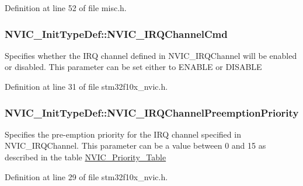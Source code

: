 Definition at line 52 of file misc.\+h.

\subsubsection[{\texorpdfstring{N\+V\+I\+C\+\_\+\+I\+R\+Q\+Channel\+Cmd}{NVIC_IRQChannelCmd}}]{ N\+V\+I\+C\+\_\+\+Init\+Type\+Def\+::\+N\+V\+I\+C\+\_\+\+I\+R\+Q\+Channel\+Cmd}\hypertarget{struct_n_v_i_c___init_type_def_acb23fabb995fa4980c768825f12f5815}{}\label{struct_n_v_i_c___init_type_def_acb23fabb995fa4980c768825f12f5815}
Specifies whether the I\+RQ channel defined in N\+V\+I\+C\+\_\+\+I\+R\+Q\+Channel will be enabled or disabled. This parameter can be set either to E\+N\+A\+B\+LE or D\+I\+S\+A\+B\+LE 

Definition at line 31 of file stm32f10x\+\_\+nvic.\+h.

\subsubsection[{\texorpdfstring{N\+V\+I\+C\+\_\+\+I\+R\+Q\+Channel\+Preemption\+Priority}{NVIC_IRQChannelPreemptionPriority}}]{ N\+V\+I\+C\+\_\+\+Init\+Type\+Def\+::\+N\+V\+I\+C\+\_\+\+I\+R\+Q\+Channel\+Preemption\+Priority}\hypertarget{struct_n_v_i_c___init_type_def_adc8226d770dbf7513448c12e14f30198}{}\label{struct_n_v_i_c___init_type_def_adc8226d770dbf7513448c12e14f30198}
Specifies the pre-\/emption priority for the I\+RQ channel specified in N\+V\+I\+C\+\_\+\+I\+R\+Q\+Channel. This parameter can be a value between 0 and 15 as described in the table \hyperlink{group___n_v_i_c___priority___table}{N\+V\+I\+C\+\_\+\+Priority\+\_\+\+Table} 

Definition at line 29 of file stm32f10x\+\_\+nvic.\+h.

